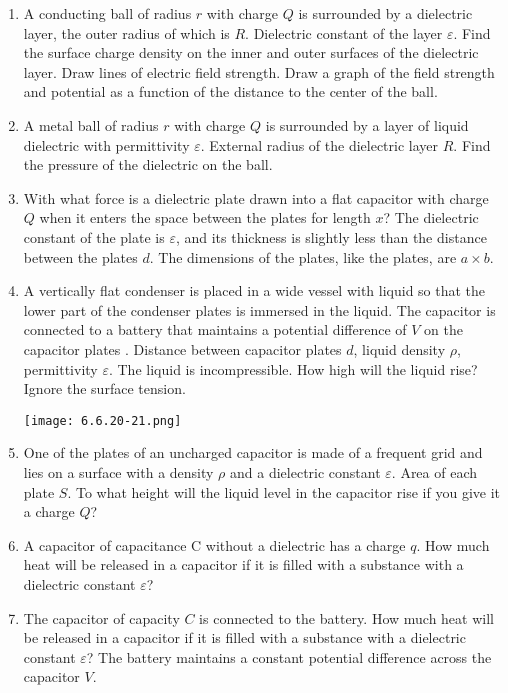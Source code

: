 \documentclass{article}
\begin{document}
\begin{enumerate}[label=6.6.\arabic*]
\item A conducting ball of radius $r$ with charge $Q$ is surrounded by a dielectric layer, the outer radius of which is $R$. Dielectric constant of the layer $\varepsilon$. Find the surface charge density on the inner and outer surfaces of the dielectric layer. Draw lines of electric field strength. Draw a graph of the field strength and potential as a function of the distance to the center of the ball.

\item A metal ball of radius $r$ with charge $Q$ is surrounded by a layer of liquid dielectric with permittivity $\varepsilon$. External radius of the dielectric layer $R$. Find the pressure of the dielectric on the ball.

\item With what force is a dielectric plate drawn into a flat capacitor with charge $Q$ when it enters the space between the plates for length $x$? The dielectric constant of the plate is $\varepsilon$, and its thickness is slightly less than the distance between the plates $d$. The dimensions of the plates, like the plates, are $a \times b$.

\item A vertically flat condenser is placed in a wide vessel with liquid so that the lower part of the condenser plates is immersed in the liquid. The capacitor is connected to a battery that maintains a potential difference of $V$ on the capacitor plates . Distance between capacitor plates $d$, liquid density $\rho$, permittivity $\varepsilon$. The liquid is incompressible. How high will the liquid rise? Ignore the surface tension.

\begin{center}
    \texttt{[image: 6.6.20-21.png]}
\end{center}

\item One of the plates of an uncharged capacitor is made of a frequent grid and lies on a surface with a density $\rho$ and a dielectric constant $\varepsilon$. Area of each plate $S$. To what height will the liquid level in the capacitor rise if you give it a charge $Q$?

\item A capacitor of capacitance C without a dielectric has a charge $q$. How much heat will be released in a capacitor if it is filled with a substance with a dielectric constant $\varepsilon$?

\item The capacitor of capacity $C$ is connected to the battery. How much heat will be released in a capacitor if it is filled with a substance with a dielectric constant $\varepsilon$? The battery maintains a constant potential difference across the capacitor $V$.


\end{enumerate}
\end{document}
